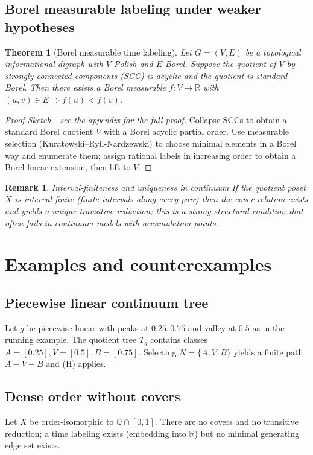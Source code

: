 \documentclass[11pt]{article}
\newtheorem{theorem}[definition]{Theorem}
\newtheorem{remark}[definition]{Remark}
\begin{document}
\subsection{Borel measurable labeling under weaker hypotheses}
\begin{theorem}[Borel measurable time labeling]\label{thm:polish}
Let \(G=(V,E)\) be a topological informational digraph with \(V\) Polish
and \(E\) Borel. Suppose the quotient of \(V\) by strongly connected
components (SCC)	 is acyclic and the quotient is standard Borel. Then there
exists a Borel measurable \(f:V\to\mathbb R\) with \((u,v)\in E\Rightarrow f(u)<f(v)\).
\end{theorem}

\begin{proof}[Proof Sketch - see the appendix for the full proof]
Collapse SCCs to obtain a standard Borel quotient \(\widetilde V\) with a
Borel acyclic partial order. Use measurable selection (Kuratowski–Ryll‑Nardzewski)
to choose minimal elements in a Borel way and enumerate them; assign
rational labels in increasing order to obtain a Borel linear extension,
then lift to \(V\).
\end{proof}

\begin{remark}
Interval‑finiteness and uniqueness in continuum
If the quotient poset \(X\) is interval‑finite (finite intervals along
every pair) then the cover relation exists and yields a unique transitive
reduction; this is a strong structural condition that often fails in
continuum models with accumulation points.

\end{remark}




\section{Examples and counterexamples}\label{sec:examples}
\subsection{Piecewise linear continuum tree}
Let \(g\) be piecewise linear with peaks at \(0.25,0.75\) and valley at
\(0.5\) as in the running example. The quotient tree \(T_g\) contains
classes \(A=[0.25],V=[0.5],B=[0.75]\). Selecting \(N=\{A,V,B\}\) yields a
finite path \(A-V-B\) and (H) applies.

\subsection{Dense order without covers}
Let \(X\) be order‑isomorphic to \(\mathbb Q\cap[0,1]\). There are no
covers and no transitive reduction; a time labeling exists (embedding into
\(\mathbb R\)) but no minimal generating edge set exists.
\end{document}
